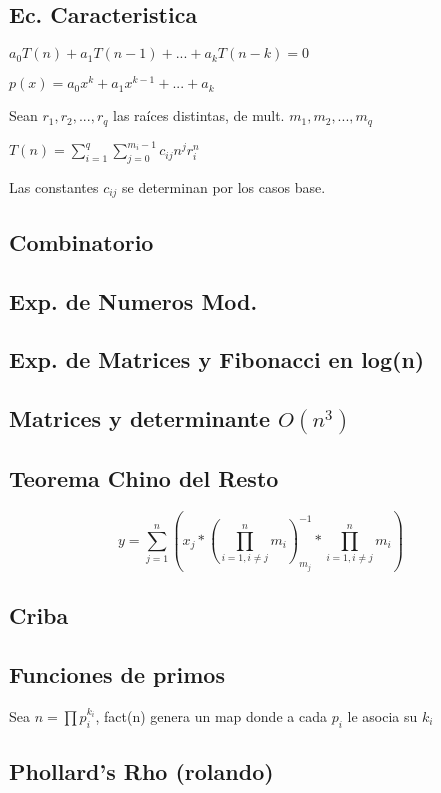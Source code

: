 \subsection{Ec. Caracteristica}
$a_0T(n)+a_1T(n-1)+...+a_kT(n-k)=0$

$p(x)=a_0 x^k + a_1 x^{k-1} + ... + a_k$

Sean $r_1,r_2,...,r_q$ las raíces distintas, de mult. $m_1, m_2, ..., m_q$

$T(n)=\sum_{i=1}^q{\sum_{j=0}^{m_i - 1}c_{ij} n^j r_i^n}$

Las constantes $c_{ij}$ se determinan por los casos base.
\subsection{Combinatorio}
\subsection{Exp. de Numeros Mod.}
\subsection{Exp. de Matrices y Fibonacci en log(n)}
\subsection{Matrices y determinante $O(n^3)$}
\subsection{Teorema Chino del Resto}
$$y=\sum_{j=1}^n (x_j*(\prod_{i=1, i\neq j}^n m_i)_{m_j}^{-1}*\prod_{i=1, i\neq j}^n m_i)$$
\subsection{Criba}
\subsection{Funciones de primos}
Sea $n=\prod{p_i^{k_i}}$, fact(n) genera un map donde a cada $p_i$ le asocia su $k_i$
\subsection{Phollard's Rho (rolando)}
